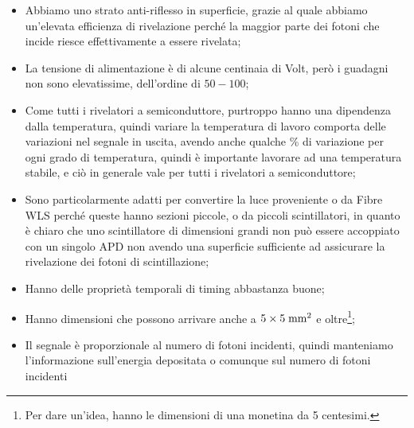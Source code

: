 \begin{itemize}[leftmargin=0.5cm]
   \item Abbiamo uno strato anti-riflesso in superficie, grazie al quale abbiamo un'elevata efficienza di rivelazione perché la maggior parte dei fotoni che incide riesce effettivamente a essere rivelata;
   \item La tensione di alimentazione è di alcune centinaia di Volt, però i guadagni non sono elevatissime, dell'ordine di $50-100$;
   \item Come tutti i rivelatori a semiconduttore, purtroppo hanno una dipendenza dalla temperatura, quindi variare la temperatura di lavoro comporta delle variazioni nel segnale in uscita, avendo anche qualche \% di variazione per ogni grado di temperatura, quindi è importante lavorare ad una temperatura stabile, e ciò in generale vale per tutti i rivelatori a semiconduttore;
   \item Sono particolarmente adatti per convertire la luce proveniente o da Fibre WLS perché queste hanno sezioni piccole, o da piccoli scintillatori, in quanto è chiaro che uno scintillatore di dimensioni grandi non può essere accoppiato con un singolo APD non avendo una superficie sufficiente ad assicurare la rivelazione dei fotoni di scintillazione;
   \item Hanno delle proprietà temporali di timing abbastanza buone;
   \item Hanno dimensioni che possono arrivare anche a $5 \times 5 \; \rm mm^2$ e oltre\footnote{Per dare un'idea, hanno le dimensioni di una monetina da 5 centesimi.};
   \item Il segnale è proporzionale al numero di fotoni incidenti, quindi manteniamo l'informazione sull'energia depositata o comunque sul numero di fotoni incidenti
\end{itemize}

